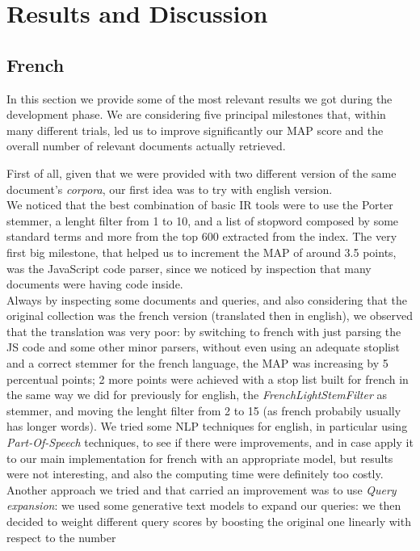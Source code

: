 \pagebreak
\section{Results and Discussion}
\subsection{French}
\label{sec:results}

In this section we provide some of the most relevant results we got during the development phase.
We are considering five principal milestones that, within many different trials, led us to improve significantly our MAP score and the overall number of relevant documents actually retrieved.



First of all, given that we were provided with two different version of the same document's \textit{corpora}, our first idea was to try with english version.\\ 
We noticed that the best combination of basic IR tools were to use the Porter stemmer, a lenght filter from 1 to 10, and a list of stopword composed by some standard terms and more from the top 600 extracted from the index.
The very first big milestone, that helped us to increment the MAP of around 3.5 points, was the JavaScript code parser, since we noticed by inspection that many documents were having code inside.\\
Always by inspecting some documents and queries, and also considering that the original collection was the french version (translated then in english), we observed that the translation was very poor: by switching to french
with just parsing the JS code and some other minor parsers, without even using an adequate stoplist and a correct stemmer for the french language, the MAP was increasing by 5 percentual points; 2 more points were achieved with
a stop list built for french in the same way we did for previously for english, the \textit{FrenchLightStemFilter} as stemmer, and moving the lenght filter from 2 to 15 (as french probabily usually has longer words).
We tried some NLP techniques for english, in particular using \textit{Part-Of-Speech} techniques, to see if there were improvements, and in case apply it to our main implementation for french with an appropriate model, but results 
were not interesting, and also the computing time were definitely too costly.
Another approach we tried and that carried an improvement was to use \textit{Query expansion}: we used some generative text models to expand our queries: we then decided to weight different query scores by boosting the original one linearly with respect to the number
